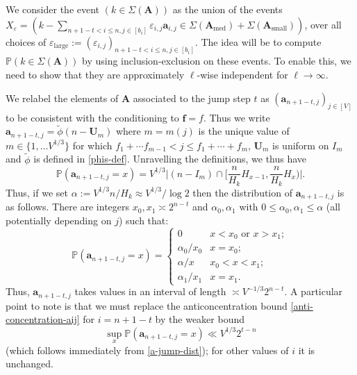 \documentclass[11pt,reqno]{amsart}
\numberwithin{equation}{section}
\theoremstyle{definition}
\theoremstyle{remark}
\newcommand{\mb}{\mathbb}
\newcommand{\mbf}{\mathbf}
\newcommand{\eps}{\varepsilon}
\renewcommand{\le}{\leqslant}
\def\sml{\operatorname{small}}
\def\lrg{\operatorname{large}}
\def\med{\operatorname{med}}
\begin{document}
We consider the event $(k \in \Sigma(\mbf{A}))$ as the union of the events $X_{\eps} = (k - \sum_{n + 1 - t < i \le n, j \in [b_i]} \eps_{i,j} \mbf{a}_{i,j} \in \Sigma(\mbf{A}_{\med}) + \Sigma(\mbf{A}_{\sml}))$, over all choices of $\eps_{\lrg} := (\eps_{i,j})_{n + 1 - t < i \le n, j \in [b_i]}$. The idea will be to compute $\mb{P}(k \in \Sigma(\mbf{A}))$ by using inclusion-exclusion on these events. To enable this, we need to show that they are approximately $\ell$-wise independent for $\ell \rightarrow \infty$.

We relabel the elements of $\mbf{A}$ associated to the jump step $t$ as $(\mbf{a}_{n + 1 -t,j})_{j \in [V]}$ to be consistent with the conditioning to $\mbf{f} = f$. Thus we write $\mbf{a}_{n + 1 - t,j} = \tilde\phi (n - \mbf{U}_m)$ where $m = m(j)$ is the unique value of $m \in \{1,\dots V^{1/3}\}$ for which $f_1 + \cdots f_{m-1} < j \le f_1 + \cdots + f_m$, $\mbf{U}_m$ is uniform on $I_m$ and $\tilde\phi$ is defined in \cref{phis-def}. Unravelling the definitions, we thus have 
\[ \mb{P}(\mbf{a}_{n + 1 - t,j} = x) = V^{1/3}\big| (n - I_m) \cap \big[ \frac{n}{H_k} H_{x-1}, \frac{n}{H_k} H_x\big)\big|.\] Thus, if we set $\alpha := V^{1/3}n/H_k \approx V^{1/3}/\log 2$ then the distribution of $\mbf{a}_{n + 1 - t,j}$ is as follows. There are integers $x_0, x_1 \asymp 2^{n - t}$ and $\alpha_0, \alpha_1$ with $0 \le \alpha_0, \alpha_1 \le \alpha$ (all potentially depending on $j$) such that:
\begin{equation}\label{a-jump-dist} \mb{P}(\mbf{a}_{n +1 - t,j} = x) = \left\{ \begin{array}{ll} 0 & \mbox{$x < x_0$ or $x > x_1$};\\ \alpha_0/x_0 & x = x_0; \\ \alpha/x & x_0 < x < x_1;\\ \alpha_1/x_1 & x = x_1.  \end{array}\right.\end{equation}
Thus, $\mbf{a}_{n + 1 - t, j}$ takes values in an interval of length $\asymp V^{-1/3} 2^{n - t}$. A particular point to note is that we must replace the anticoncentration bound \cref{anti-concentration-aij} for $i = n + 1 -t$ by the weaker bound
 \begin{equation}\label{anti-concentration-jump-scale} \sup_x \mb{P}(\mbf{a}_{n + 1- t,j} = x) \ll V^{1/3} 2^{t - n}\end{equation} (which follows immediately from \cref{a-jump-dist}); for other values of $i$ it is unchanged.
\end{document}
